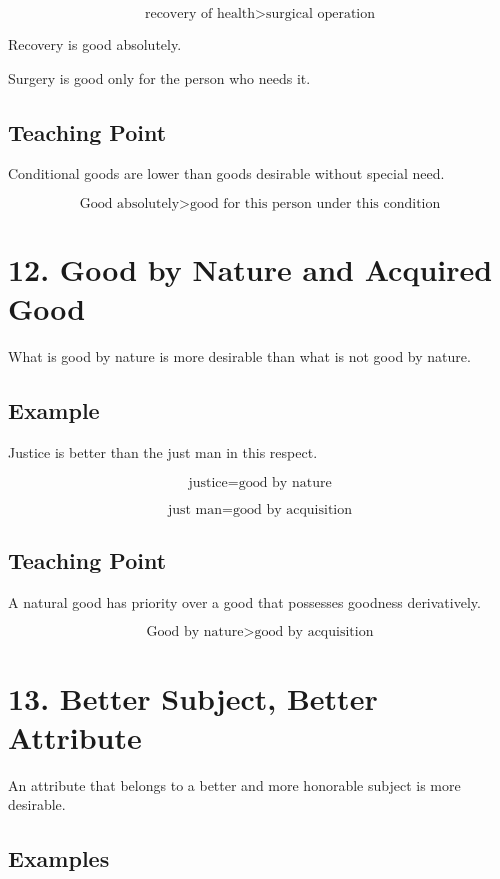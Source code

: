 \documentclass[12pt]{article}
\begin{document}
\[
\text{recovery of health} > \text{surgical operation}
\]

Recovery is good absolutely.

Surgery is good only for the person who needs it.

\subsection*{Teaching Point}

Conditional goods are lower than goods desirable without special need.

\[
\boxed{
\text{Good absolutely} > \text{good for this person under this condition}
}
\]

\section*{12. Good by Nature and Acquired Good}

What is good by nature is more desirable than what is not good by nature.

\subsection*{Example}

Justice is better than the just man in this respect.

\[
\text{justice} = \text{good by nature}
\]

\[
\text{just man} = \text{good by acquisition}
\]

\subsection*{Teaching Point}

A natural good has priority over a good that possesses goodness derivatively.

\[
\boxed{
\text{Good by nature} > \text{good by acquisition}
}
\]

\section*{13. Better Subject, Better Attribute}

An attribute that belongs to a better and more honorable subject is more
desirable.

\subsection*{Examples}
\end{document}
